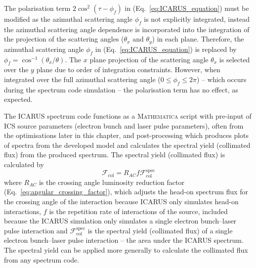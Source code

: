 \documentclass[../main.tex]{subfiles}
\begin{document}
The polarisation term $2\cos^{2}\left(\tau-\phi_{f}\right)$ in (Eq.~\ref{eq:ICARUS_equation}) must be modified as the azimuthal scattering angle $\phi_{f}$ is not explicitly integrated, instead the azimuthal scattering angle dependence is incorporated into the integration of the projection of the scattering angles ($\theta_{x}$ and $\theta_{y}$) in each plane. Therefore, the azimuthal scattering angle $\phi_{f}$ in (Eq.~\ref{eq:ICARUS_equation}) is replaced by $\phi_{f} = \cos^{-1}\left(\theta_{x}/\theta\right)$. The $x$ plane projection of the scattering angle $\theta_{x}$ is selected over the $y$ plane due to order of integration constraints. However, when integrated over the full azimuthal scattering angle ($0 \leq \phi_{f} \leq 2\pi$) -- which occurs during the spectrum code simulation -- the polarisation term has no effect, as expected.

The \textsc{ICARUS} spectrum code functions as a \textsc{Mathematica} script with pre-input of ICS source parameters (electron bunch and laser pulse parameters), often from the optimisations later in this chapter, and post-processing which produces plots of spectra from the developed model and calculates the spectral yield (collimated flux) from the produced spectrum. The spectral yield (collimated flux) is calculated by 
\begin{equation}
\mathcal{F}_{\mathrm{col}} = R_{AC}f\mathcal{F}^{\mathrm{spec}}_{\mathrm{col}}    
\label{eq:spectral_yield}
\end{equation}
where $R_{AC}$ is the crossing angle luminosity reduction factor (Eq.~\ref{eq:angular_crossing_factor}), which adjusts the head-on spectrum flux for the crossing angle of the interaction because \textsc{ICARUS} only simulates head-on interactions, $f$ is the repetition rate of interactions of the source, included because the \textsc{ICARUS} simulation only simulates a single electron bunch--laser pulse interaction and $\mathcal{F}^{\mathrm{spec}}_{\mathrm{col}}$ is the spectral yield (collimated flux) of a single electron bunch--laser pulse interaction -- the area under the \textsc{ICARUS} spectrum. The spectral yield can be applied more generally to calculate the collimated flux from any spectrum code. 
\end{document}
